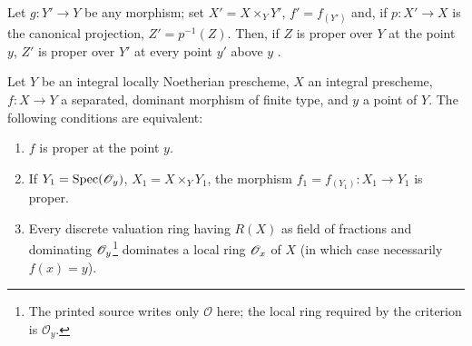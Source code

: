 Let $g:Y'\to Y$ be any morphism; set $X'=X\times_Y Y'$, $f'=f_{(Y')}$ and, if $p:X'\to X$ is the canonical projection, $Z'=p^{-1}(Z)$.
Then, if $Z$ is proper over $Y$ at the point $y$, $Z'$ is proper over $Y'$ at every point $y'$ above $y$ .

\begin{proposition}[15.7.2]
\label{IV.15.7.2}
Let $Y$ be an integral locally Noetherian prescheme, $X$ an integral prescheme, $f:X\to Y$ a separated, dominant morphism of finite type, and $y$ a point of $Y$.
The following conditions are equivalent:
\begin{enumerate}[label=\emph{\alph*)}]
  \item $f$ is proper at the point $y$.
  \item If $Y_1=\operatorname{Spec}(\mathscr{O}_y)$, $X_1=X\times_Y Y_1$, the morphism $f_1=f_{(Y_1)}:X_1\to Y_1$ is proper.
  \item Every discrete valuation ring having $R(X)$ as field of fractions and dominating $\mathscr{O}_y$\footnote{The printed source writes only $\mathcal O$ here; the local ring required by the criterion is $\mathcal O_y$.} dominates a local ring $\mathscr{O}_x$ of $X$ \textup{(in which case necessarily $f(x)=y$)}.
\end{enumerate}
\end{proposition}

